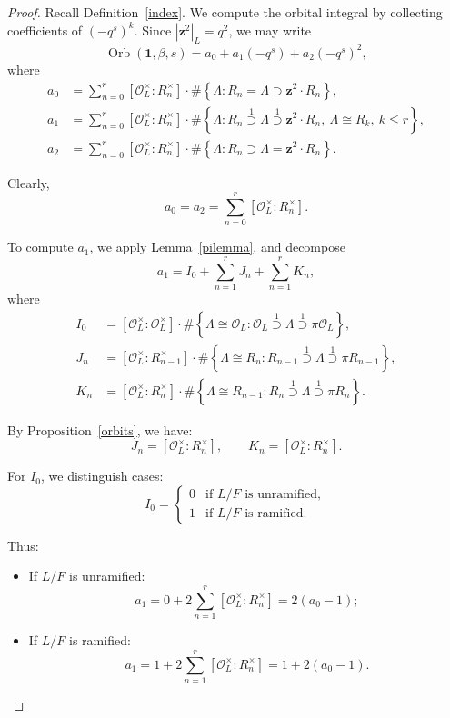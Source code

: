\documentclass[10pt,a4paper]{amsart}
\newcommand{\CO}{\mathcal{O}}
\newcommand{\Orb}{\operatorname{Orb}}
\newcommand{\mb}[1]{\mathbf{#1}}
\begin{document}
\begin{proof}
Recall Definition~\ref{index}. We compute the orbital integral by collecting coefficients of $(-q^s)^k$. Since $|\mb z^2|_L = q^2$, we may write
$$
\Orb(\mathbf{1}, \beta, s) = a_0 + a_1(-q^s) + a_2(-q^s)^2,
$$
where
\begin{align*}
a_0 &= \sum_{n=0}^r \left[\CO_L^\times : R_n^\times\right] \cdot \#\left\{ \Lambda : R_n = \Lambda \supset \mb z^2 \cdot R_n \right\}, \\
a_1 &= \sum_{n=0}^r \left[\CO_L^\times : R_n^\times\right] \cdot \#\left\{ \Lambda : R_n \overset{1}{\supset} \Lambda \overset{1}{\supset} \mb z^2 \cdot R_n,\ \Lambda \cong R_k,\ k \leq r \right\}, \\
a_2 &= \sum_{n=0}^r \left[\CO_L^\times : R_n^\times\right] \cdot \#\left\{ \Lambda : R_n \supset \Lambda = \mb z^2 \cdot R_n \right\}.
\end{align*}

Clearly,
\begin{equation}\label{a02}
a_0 = a_2 = \sum_{n=0}^r \left[\CO_L^\times : R_n^\times\right].
\end{equation}

To compute $a_1$, we apply Lemma~\ref{pilemma}, and decompose
$$
a_1 = I_0 + \sum_{n=1}^r J_n + \sum_{n=1}^r K_n,
$$
where
\begin{align*}
I_0 &= \left[\CO_L^\times : \CO_L^\times\right] \cdot \#\left\{ \Lambda \cong \CO_L : \CO_L \overset{1}{\supset} \Lambda \overset{1}{\supset} \pi \CO_L \right\}, \\
J_n &= \left[\CO_L^\times : R_{n-1}^\times\right] \cdot \#\left\{ \Lambda \cong R_n : R_{n-1} \overset{1}{\supset} \Lambda \overset{1}{\supset} \pi R_{n-1} \right\}, \\
K_n &= \left[\CO_L^\times : R_n^\times\right] \cdot \#\left\{ \Lambda \cong R_{n-1} : R_n \overset{1}{\supset} \Lambda \overset{1}{\supset} \pi R_n \right\}.
\end{align*}

By Proposition~\ref{orbits}, we have:
$$
J_n = \left[\CO_L^\times : R_n^\times\right], \qquad
K_n = \left[\CO_L^\times : R_n^\times\right].
$$

For $I_0$, we distinguish cases:
$$
I_0 =
\begin{cases}
0 & \text{if $L/F$ is unramified}, \\
1 & \text{if $L/F$ is ramified}.
\end{cases}
$$

Thus:
\begin{itemize}
\item If $L/F$ is unramified:
$$
a_1 = 0 + 2 \sum_{n=1}^r \left[\CO_L^\times : R_n^\times\right] = 2(a_0 - 1);
$$
\item If $L/F$ is ramified:
$$
a_1 = 1 + 2 \sum_{n=1}^r \left[\CO_L^\times : R_n^\times\right] = 1 + 2(a_0 - 1).
$$
\end{itemize}


\end{proof}
\end{document}
